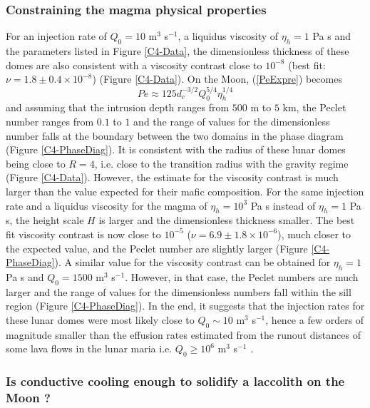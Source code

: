 \subsubsection*{Constraining the magma physical properties}
\label{sec:visc-contr-lunar}

For  an  injection  rate  of $Q_0=10$  m$^{3}$  s$^{-1}$,  a  liquidus
viscosity of  $\eta_h= 1$  Pa s  and the  parameters listed  in Figure
\ref{C4-Data},  the dimensionless  thickness of  these domes  are also
consistent with  a viscosity  contrast close  to $10^{-8}$  (best fit:
$\nu=1.8  \pm 0.4  \times  10^{-8}$) (Figure  \ref{C4-Data}).  On  the
Moon, (\ref{PeExpre}) becomes
\begin{equation}
  Pe \approx 125 d_c^{-3/2} Q_0^{5/4}\eta_h^{1/4}
  \label{PeExpreMoon}
\end{equation}
and assuming that  the intrusion depth ranges from $500$  m to $5$ km,
the Peclet number ranges from $0.1$ to $1$ and the range of values for
the dimensionless number falls at the boundary between the two domains
in the  phase diagram  (Figure \ref{C4-PhaseDiag}).  It  is consistent
with the radius of these lunar domes being close to $R=4$, i.e.  close
to   the   transition  radius   with   the   gravity  regime   (Figure
\ref{C4-Data}).  However,  the estimate for the  viscosity contrast is
much larger than the value  expected for their mafic composition.  For
the same  injection rate  and a  liquidus viscosity  for the  magma of
$\eta_h=10^3$ Pa s instead of $\eta_h=1$ Pa s, the height scale $H$ is
larger and the dimensionless thickness smaller. The best fit viscosity
contrast        is        now         close        to        $10^{-5}$
($\nu  = 6.9  \pm 1.8  \times10^{-6}$),  much closer  to the  expected
value,   and   the  Peclet   number   are   slightly  larger   (Figure
\ref{C4-PhaseDiag}).  A  similar value for the  viscosity contrast can
be  obtained  for  $\eta_h=1$  Pa s  and  $Q_0=1500$  m$^3$  s$^{-1}$.
However, in  that case,  the Peclet  numbers are  much larger  and the
range of  values for  the dimensionless numbers  fall within  the sill
region (Figure \ref{C4-PhaseDiag}).  In the end, it  suggests that the
injection  rates for  these  lunar  domes were  most  likely close  to
$Q_0\sim 10$ m$^{3}$ s$^{-1}$, hence a few orders of magnitude smaller
than the  effusion rates estimated  from the runout distances  of some
lava  flows in  the lunar  maria  i.e.  $Q_0\ge  10^6$ m$^3$  s$^{-1}$
\citep{TracyKPGregg:1996wp}.

\subsubsection*{Is conductive  cooling enough to solidify  a laccolith
  on the Moon ?}
\label{sec:visc-contr-lunar}

